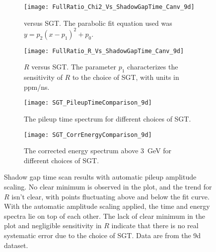 \begin{figure}
\centering
    \begin{subfigure}[t]{0.45\textwidth}
        \centering
        \texttt{[image: FullRatio\_Chi2\_Vs\_ShadowGapTime\_Canv\_9d]}
        \caption{\chisq versus SGT. The parabolic fit equation used was $y = p_{2}(x - p_{1})^{2} + p_{0}.$}
    \end{subfigure}%
    \hspace{1cm}
    \begin{subfigure}[t]{0.45\textwidth}
        \centering
        \texttt{[image: FullRatio\_R\_Vs\_ShadowGapTime\_Canv\_9d]}
        \caption{$R$ versus SGT. The parameter $p_{1}$ characterizes the sensitivity of $R$ to the choice of SGT, with units in ppm/ns.}
    \end{subfigure}

    \begin{subfigure}[t]{0.45\textwidth}
        \centering
        \texttt{[image: SGT\_PileupTimeComparison\_9d]}
        \caption{The pileup time spectrum for different choices of SGT.}
    \end{subfigure}%
    \hspace{1cm}
    \begin{subfigure}[t]{0.45\textwidth}
        \centering
        \texttt{[image: SGT\_CorrEnergyComparison\_9d]}
        \caption{The corrected energy spectrum above \SI{3}{\GeV} for different choices of SGT.}
    \end{subfigure}
\caption[Pileup shadow gap time scan with automatic pileup amplitude scaling]{Shadow gap time scan results with automatic pileup amplitude scaling. No clear minimum is observed in the \chisq plot, and the trend for $R$ isn't clear, with points fluctuating above and below the fit curve. With the automatic amplitude scaling applied, the time and energy spectra lie on top of each other. The lack of clear minimum in the \chisq plot and negligible sensitivity in $R$ indicate that there is no real systematic error due to the choice of SGT. Data are from the 9d dataset.}
\label{fig:SGTscan}
\end{figure}


